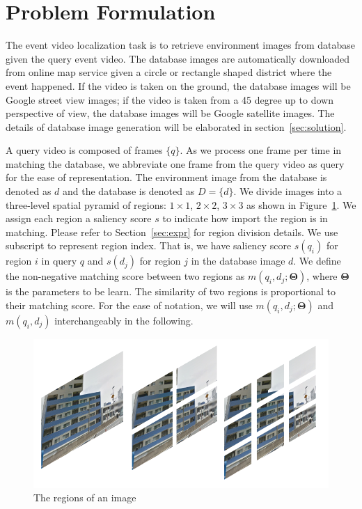 \section{Problem Formulation}
\label{sec:problem}
The event video localization task is to retrieve environment images from database given the query event video. 
The database images are automatically downloaded from online map service given a circle or rectangle shaped district where the event happened. 
If the video is taken on the ground, the database images will be Google street view images;
if the video is taken from a 45 degree up to down perspective of view, the database images will be Google satellite images. 
The details of database image generation will be elaborated in section~\ref{sec:solution}. 

A query video is composed of frames $\{q\}$. 
As we process one frame per time in matching the database, we abbreviate one frame from the query video as query for the ease of representation. 
The environment image from the database is denoted as $d$ and the database is denoted as $D = \{d\}$. 
We divide images into a three-level spatial pyramid of regions: $1 \times 1$, $2 \times 2$, $3 \times 3$ as shown in Figure~\ref{fig:regions}. 
We assign each region a saliency score $s$ to indicate how import the region is in matching. 
Please refer to Section~\ref{sec:expr} for region division details. 
We use subscript to represent region index. 
That is, we have saliency score $s(q_i)$ for region $i$ in query $q$ and $s(d_j)$ for region $j$ in the database image $d$. 
We define the non-negative matching score between two regions as $m(q_i, d_j; \mathbf{\Theta})$, where $\mathbf{\Theta}$ is the parameters to be learn. The similarity of two regions is proportional to their matching score.
For the ease of notation, we will use $m(q_i, d_j; \mathbf{\Theta})$ and $m(q_i, d_j)$ interchangeably in the following. 
\begin{figure}[htbp]
\includegraphics[width=0.8\linewidth]{img/regions}
\caption{The regions of an image}
\label{fig:regions}
\end{figure}

